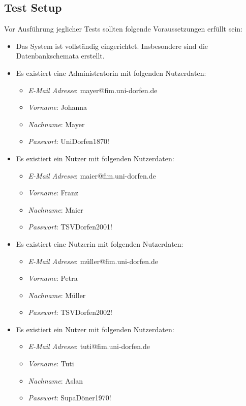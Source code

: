 \subsection{Test Setup}
Vor Ausführung jeglicher Tests sollten folgende Voraussetzungen erfüllt sein:
\begin{itemize}
	\item Das System ist vollständig eingerichtet.
	Insbesondere sind die Datenbankschemata erstellt.
	\item Es existiert eine Administratorin mit folgenden Nutzerdaten:
	\begin{itemize}
		\item \emph{E-Mail Adresse}: mayer@fim.uni-dorfen.de
		\item \emph{Vorname}: Johanna
		\item \emph{Nachname}: Mayer
		\item \emph{Passwort}: UniDorfen1870!
	\end{itemize}
	\item Es existiert ein Nutzer mit folgenden Nutzerdaten:
	\begin{itemize}
		\item \emph{E-Mail Adresse}: maier@fim.uni-dorfen.de
		\item \emph{Vorname}: Franz
		\item \emph{Nachname}: Maier
		\item \emph{Passwort}: TSVDorfen2001!
	\end{itemize}
	\item Es existiert eine Nutzerin mit folgenden Nutzerdaten:
	\begin{itemize}
		\item \emph{E-Mail Adresse}: müller@fim.uni-dorfen.de
		\item \emph{Vorname}: Petra
		\item \emph{Nachname}: Müller
		\item \emph{Passwort}: TSVDorfen2002!
	\end{itemize}
	\item Es existiert ein Nutzer mit folgenden Nutzerdaten:
	\begin{itemize}
		\item \emph{E-Mail Adresse}: tuti@fim.uni-dorfen.de
		\item \emph{Vorname}: Tuti
		\item \emph{Nachname}: Aslan
		\item \emph{Passwort}: SupaDöner1970!
	\end{itemize}
\end{itemize}

